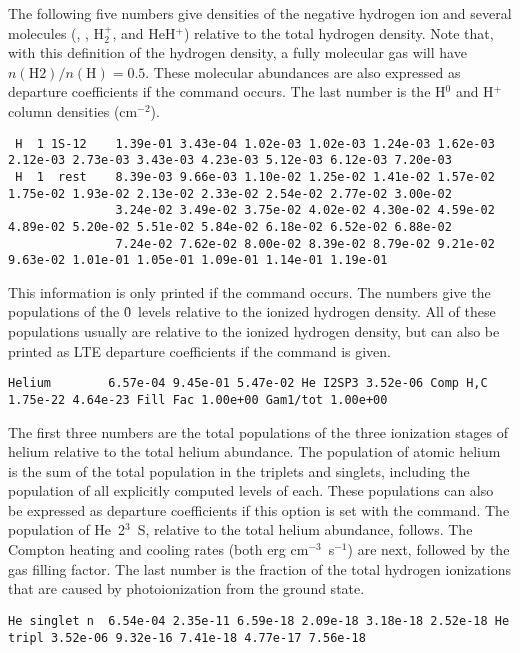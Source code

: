 The following five numbers give densities of the negative hydrogen ion
and several molecules (\hminus, \htwo, H$_2^+$, and HeH$^+$)
relative to the total hydrogen density.
Note that, with this definition of the hydrogen density, a fully
molecular gas will have $n(\mathrm{H}2)/n(\mathrm{H})=0.5$.
These molecular abundances are
also expressed as departure coefficients if the
command occurs.
The last number is the H$^0$ and H$^+$ column densities
(cm$^{-2}$).
{\setverbatimfontsize{\tiny}
\begin{verbatim}
 H  1 1S-12    1.39e-01 3.43e-04 1.02e-03 1.02e-03 1.24e-03 1.62e-03 2.12e-03 2.73e-03 3.43e-03 4.23e-03 5.12e-03 6.12e-03 7.20e-03
 H  1  rest    8.39e-03 9.66e-03 1.10e-02 1.25e-02 1.41e-02 1.57e-02 1.75e-02 1.93e-02 2.13e-02 2.33e-02 2.54e-02 2.77e-02 3.00e-02
               3.24e-02 3.49e-02 3.75e-02 4.02e-02 4.30e-02 4.59e-02 4.89e-02 5.20e-02 5.51e-02 5.84e-02 6.18e-02 6.52e-02 6.88e-02
               7.24e-02 7.62e-02 8.00e-02 8.39e-02 8.79e-02 9.21e-02 9.63e-02 1.01e-01 1.05e-01 1.09e-01 1.14e-01 1.19e-01
\end{verbatim}
}
This information is only printed if the
 command occurs.
The numbers give the populations of the \h0\ levels relative to the
ionized hydrogen density.
All of these populations usually are relative
to the ionized hydrogen density, but can also be printed as LTE departure
coefficients if the  command
is given.
{\setverbatimfontsize{\tiny}
\begin{verbatim}
Helium        6.57e-04 9.45e-01 5.47e-02 He I2SP3 3.52e-06 Comp H,C 1.75e-22 4.64e-23 Fill Fac 1.00e+00 Gam1/tot 1.00e+00
\end{verbatim}
}

The first three numbers are the total populations of the three ionization
stages of helium relative to the total helium abundance.
The population
of atomic helium is the sum of the total population in the triplets and
singlets, including the population of all explicitly computed levels of
each.
These populations can also be expressed as departure coefficients
if this option is set with the  command.
The
population of He~2$^3$~S, relative to the total helium abundance, follows.
The Compton heating and cooling rates (both erg cm$^{-3}$~s$^{-1}$) are next, followed
by the gas filling factor.
The last number is the fraction of the total
hydrogen ionizations that are caused by photoionization from the ground
state.
{\setverbatimfontsize{\tiny}
\begin{verbatim}
He singlet n  6.54e-04 2.35e-11 6.59e-18 2.09e-18 3.18e-18 2.52e-18 He tripl 3.52e-06 9.32e-16 7.41e-18 4.77e-17 7.56e-18
\end{verbatim}
}

